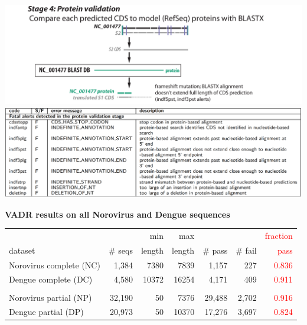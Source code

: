 \documentclass[landscape]{slides}
\begin{document}
\begin{slide}
\begin{center}

\includegraphics[width=10.5in]{figs/v-annotate-stage4-2}
\includegraphics[width=10.5in]{figs/ss-protein-alert-list}

\end{center}
\vfill
\end{slide}
\begin{slide}
\begin{center}
\textbf{VADR results on all Norovirus and Dengue sequences}


\scriptsize
\begin{tabular}{l|r|r|r|r|r|r}
                        &         & min    & max      &         &         & \textcolor{red}{fraction} \\
 dataset                & \# seqs & length & length   & \# pass & \# fail & \textcolor{red}{pass} \\ \hline
Norovirus complete (NC) & 1,384    & 7380  & 7839     & 1,157    & 227     & \textcolor{red}{0.836} \\
Dengue complete (DC)    & 4,580    & 10372 & 16254    & 4,171    & 409     & \textcolor{red}{0.911} \\
& & & & & \\
Norovirus partial (NP)  & 32,190   & 50    & 7376     & 29,488   & 2,702    & \textcolor{red}{0.916} \\
Dengue partial  (DP)    & 20,973   & 50    & 10370    & 17,276   & 3,697    & \textcolor{red}{0.824} \\
\end{tabular}

\end{center}
\vfill
\end{slide}
\end{document}
